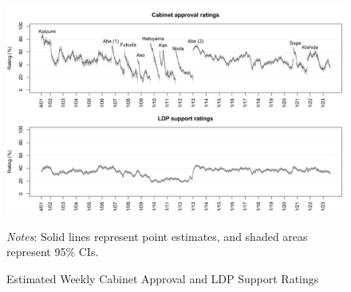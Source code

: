 \documentclass[12pt,letterpaper]{scrartcl}
\begin{document}
\begin{landscape}
\begin{figure}[t]
\begin{minipage}{\hsize}
\centering
\singlespacing
\includegraphics[scale=1]{Figure_JCR/approval_time_series.pdf}
\caption{Estimated Weekly Cabinet Approval and LDP Support Ratings}
\label{approval_time_series}
\end{minipage}
\begin{minipage}{\hsize}
\bigskip
\small
\emph{Notes}: Solid lines represent point estimates, and shaded areas represent 95\% CIs.
\end{minipage}
\end{figure}
\end{landscape}
\end{document}

